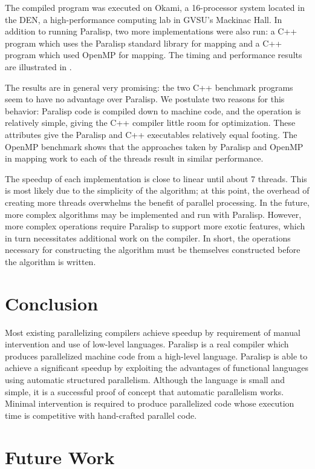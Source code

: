 \documentclass[abstracton]{scrartcl}
\begin{document}
The compiled program was executed on Okami, a 16-processor system located in the DEN, a high-performance computing lab in GVSU's Mackinac Hall. In addition to running Paralisp, two more implementations were also run: a C++ program which uses the Paralisp standard library for mapping and a C++ program which used OpenMP for mapping. The timing and performance results are illustrated in .

The results are in general very promising: the two C++ benchmark programs seem to have no advantage over Paralisp. We postulate two reasons for this behavior: Paralisp code is compiled down to machine code, and the operation is relatively simple, giving the C++ compiler little room for optimization. These attributes give the Paralisp and C++ executables relatively equal footing. The OpenMP benchmark shows that the approaches taken by Paralisp and OpenMP in mapping work to each of the threads result in similar performance.

The speedup of each implementation is close to linear until about 7 threads. This is most likely due to the simplicity of the algorithm; at this point, the overhead of creating more threads overwhelms the benefit of parallel processing. In the future, more complex algorithms may be implemented and run with Paralisp. However, more complex operations require Paralisp to support more exotic features, which in turn necessitates additional work on the compiler. In short, the operations necessary for constructing the algorithm must be themselves constructed before the algorithm is written.

\section{Conclusion}

Most existing parallelizing compilers achieve speedup by requirement of manual intervention and use of low-level languages. Paralisp is a real compiler which produces parallelized machine code from a high-level language. Paralisp is able to achieve a significant speedup by exploiting the advantages of functional languages using automatic structured parallelism. Although the language is small and simple, it is a successful proof of concept that automatic parallelism works. Minimal intervention is required to produce parallelized code whose execution time is competitive with hand-crafted parallel code.

\section{Future Work}
\end{document}

